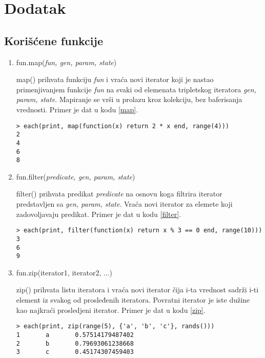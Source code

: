\documentclass[a4paper]{article}
\begin{document}
\appendix
 


\appendix
\section{Dodatak}
\subsection{Korišćene funkcije}
\label{dodaci}


\begin{enumerate}
  \item  fun.map(\textit{fun, gen, param, state})
  
  map() prihvata funkciju \textit{fun} i vraća novi iterator koji je nastao primenjivanjem funkcije \textit{fun} na svaki od elemenata tripletskog iteratora \textit{gen, param, state}. Mapiranje se vrši u prolazu kroz kolekciju, bez baferisanja vrednosti. Primer je dat u kodu \ref{map}. \cite{luafun}
   \begin{lstlisting}[caption={Primer funkcije map()},frame=single, label=map]
> each(print, map(function(x) return 2 * x end, range(4)))
2
4
6
8
\end{lstlisting}
  \item fun.filter(\textit{predicate, gen, param, state})
  
  filter() prihvata predikat \textit{predicate} na osnovu koga filtrira iterator predstavljen sa \textit{gen, param, state}. Vraća novi iterator za elemete koji zadovoljavaju predikat. Primer je dat u kodu \ref{filter}. \cite{luafun}
   \begin{lstlisting}[caption={Primer funkcije filter()},frame=single, label=filter]
> each(print, filter(function(x) return x % 3 == 0 end, range(10)))
3
6
9
\end{lstlisting}
\item fun.zip(iterator1, iterator2, ...)

   zip() prihvata listu iteratora i vraća novi iterator čija i-ta vrednost sadrži i-ti element iz svakog od prosleđenih iteratora. Povratni iterator je iste dužine kao najkraći prosledjeni iterator. Primer je dat u kodu \ref{zip}. \cite{luafun}
   \begin{lstlisting}[caption={Primer funkcije zip()},frame=single, label=zip]
> each(print, zip(range(5), {'a', 'b', 'c'}, rands()))
1       a       0.57514179487402
2       b       0.79693061238668
3       c       0.45174307459403
\end{lstlisting}
\end{enumerate}
\end{document}
